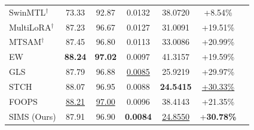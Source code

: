 \documentclass[sigconf]{acmart}
\begin{document}
\begin{table}[!pbht]
{\begin{tabular}{lcccccc}
SwinMTL$^{\dagger}$      & 73.33 & 92.87 & 0.0132 & 38.0720 & +8.54\% \\
MultiLoRA$^{\dagger}$        & 87.23 & 96.67 & 0.0127 & 31.0091 & +19.51\% \\
MTSAM$^{\dagger}$ & 87.45 & 96.80 & 0.0113 & 33.0086 & +20.99\% \\
\midrule
EW & \textbf{88.24} & \textbf{97.02} & 0.0097 & 41.3157 & +19.59\% \\
GLS & 87.79 & 96.88 & \underline{0.0085} & 25.9219 & +29.97\% \\
STCH  & 88.07 & 96.95 & 0.0088 & \textbf{24.5415} & \underline{+30.33\%} \\
FOOPS & \underline{88.21} & \underline{97.00} & 0.0096 & 38.4143 & +21.35\% \\
SIMS (Ours)  & 87.91 & 96.90 & \textbf{0.0084} & \underline{24.8550} & +\textbf{30.78\%} \\
\bottomrule
\end{tabular}
}
\vspace{-10pt}
\end{table}
\end{document}
